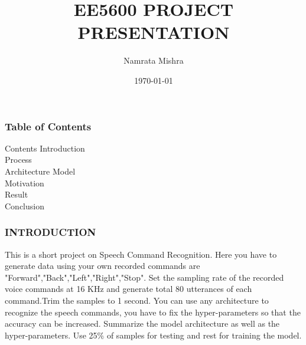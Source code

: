 \documentclass{beamer}
\title{EE5600 PROJECT PRESENTATION}
\author{Namrata Mishra}
\institute{Indian Institute of Technology, Hyderabad}
\date{\today}
\begin{document}
\begin{frame}
\titlepage
\end{frame}
\begin{frame}
\frametitle{Table of Contents}
\tableofcontents
\begin{block}{Contents}
Introduction\\ 
Process \\
Architecture Model\\
Motivation \\
Result\\
Conclusion\\
\end{block}
\end{frame}
\begin{frame}
\frametitle{INTRODUCTION}

This is a short project on Speech Command Recognition.
Here you have to generate data using your own recorded commands are "Forward","Back","Left","Right","Stop". Set the sampling rate of the recorded voice commands at 16 KHz and generate total 80 utterances of each command.Trim the samples to 1 second.
You can use any architecture to recognize the speech commands, you have to fix the hyper-parameters so that the accuracy can be increased. Summarize the model architecture as well as the hyper-parameters.
Use 25\% of samples for testing and rest for training the model.

\end{frame}
\end{document}
